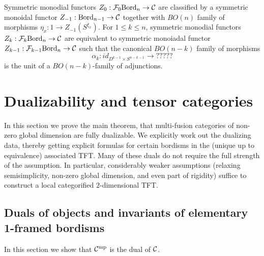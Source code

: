 \documentclass{amsart}
\begin{document}
\begin{theorem}
	Symmetric monodial functors $Z_0: \mathcal F_{0}\mathrm{Bord}_n \to \mathcal C$ are classified by a symmetric monoidal functor $Z_{-1}:\mathrm{Bord}_{n-1} \to \mathcal C$ together with $BO(n)$ family of morphisms $\eta_x: 1 \to Z_{-1}(S^{\xi_x})$. For $1 \leq k \leq n$, symmetric monodial functors $Z_k: \mathcal F_{k}\mathrm{Bord}_n \to \mathcal C$ are equivalent to symmetric monoiadal functor $Z_{k-1}: \mathcal F_{k-1}\mathrm{Bord}_n \to \mathcal C $ such that the canonical $BO(n-k)$ family of morphisms 
	\begin{equation*}
		\alpha_k: id_{D^{k-1} \times S^{n-k -1}} \to ?????
	\end{equation*}
	is the unit of a $BO(n-k)$-family of adjunctions. 
\end{theorem}


\section{Dualizability and tensor categories} \label{sec-dualfusion}

In this section we prove the main theorem, that multi-fusion categories of non-zero global dimension are fully dualizable.  We explicitly work out the dualizing data, thereby getting explicit formulas for certain bordisms in the (unique up to equivalence) associated TFT.  Many of these duals do not require the full strength of the assumption.  In particular, considerably weaker assumptions (relaxing semisimplicity, non-zero global dimension, and even part of rigidity) suffice to construct a local categorified $2$-dimensional TFT.

\subsection{Duals of objects and invariants of elementary 1-framed bordisms} \label{sec-df-objects}

In this section we show that $\mathcal C^{\mathrm{mp}}$ is the dual of $\mathcal C$. 
\end{document}
